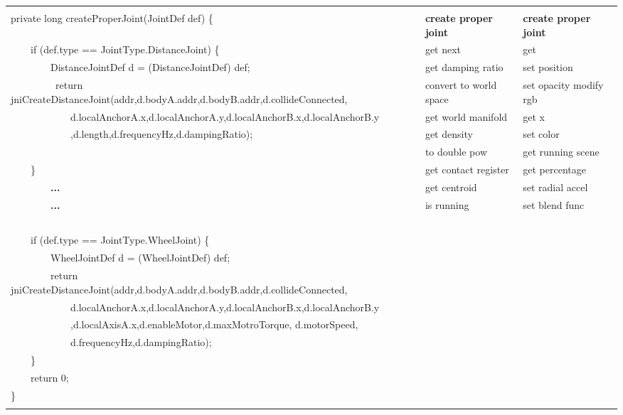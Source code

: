 \begin{table}[!htbp]
\begin{tabular} {|p{10cm}|p{3cm}|p{3cm}|}
    & & \\
    \hline

    & & \\

    private long createProperJoint(JointDef def) \{ & \textbf{create proper joint}& \textbf{create proper joint} \\
  \  \ \  \  if (def.type == JointType.DistanceJoint) \{ & get next & get\\
  \  \ \  \ \  \ \  \  DistanceJointDef d = (DistanceJointDef) def; & get damping ratio & set position \\
  \  \ \  \ \  \ \  \ \  return jniCreateDistanceJoint(addr,d.bodyA.addr,d.bodyB.addr,d.collideConnected, & convert to world space & set opacity modify rgb\\
  \  \ \  \ \  \ \  \  \  \ \  \ d.localAnchorA.x,d.localAnchorA.y,d.localAnchorB.x,d.localAnchorB.y & get world manifold & get x \\
  \  \ \  \ \  \ \  \ \  \ \  \   ,d.length,d.frequencyHz,d.dampingRatio);  & get density & set color\\
    & to double pow & get running scene\\
  \  \ \  \  \} & get contact register & get percentage \\

  \  \ \  \ \  \ \  \   \textbf{...} & get centroid & set radial accel \\
  \  \ \  \ \  \ \  \   \textbf{...} & is running& set blend func\\
  \  \ \  \ \  \ \  \    & & \\

  \  \ \  \   if (def.type == JointType.WheelJoint) \{ & & \\
  \  \ \  \ \  \ \  \   WheelJointDef d = (WheelJointDef) def; & & \\
  \  \ \  \ \  \ \  \   return jniCreateDistanceJoint(addr,d.bodyA.addr,d.bodyB.addr,d.collideConnected, & & \\
  \  \ \  \ \  \ \  \   \  \ \  \ d.localAnchorA.x,d.localAnchorA.y,d.localAnchorB.x,d.localAnchorB.y & & \\
  \  \ \  \ \  \ \  \  \  \ \  \ ,d.localAxisA.x,d.enableMotor,d.maxMotroTorque, d.motorSpeed,    & & \\
  \  \ \  \ \  \ \ \  \ \  \ \ d.frequencyHz,d.dampingRatio);  & & \\
  \  \ \  \   \} & & \\

  \  \ \  \   return 0; & & \\
    \} & & \\
    & & \\
    \hline


\end{tabular}
\end{table}
